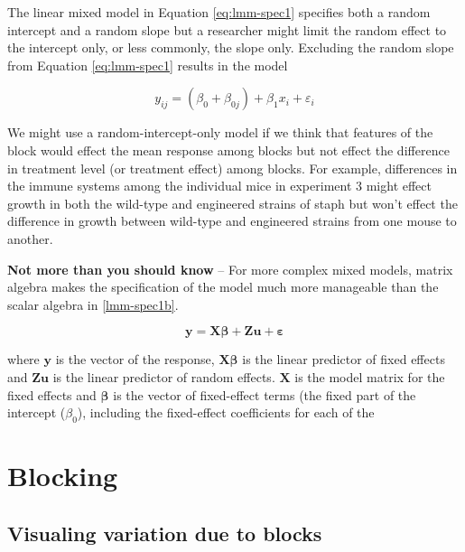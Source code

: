 \documentclass[]{book}
\begin{document}
The linear mixed model in Equation \eqref{eq:lmm-spec1} specifies both a random intercept and a random slope but a researcher might limit the random effect to the intercept only, or less commonly, the slope only. Excluding the random slope from Equation \eqref{eq:lmm-spec1} results in the model

\begin{equation}
y_{ij} = (\beta_{0} + \beta_{0j}) + \beta_{1}x_i + \varepsilon_i 
\label{eq:lmm-spec1b}
\end{equation}

We might use a random-intercept-only model if we think that features of the block would effect the mean response among blocks but not effect the difference in treatment level (or treatment effect) among blocks. For example, differences in the immune systems among the individual mice in experiment 3 might effect growth in both the wild-type and engineered strains of staph but won't effect the difference in growth between wild-type and engineered strains from one mouse to another.

\textbf{Not more than you should know} -- For more complex mixed models, matrix algebra makes the specification of the model much more manageable than the scalar algebra in \ref{lmm-spec1b}.

\begin{equation}
\mathbf{y} = \mathbf{X}\boldsymbol{\beta} + \mathbf{Zu} + \boldsymbol{\varepsilon}
\end{equation}

where \(\mathbf{y}\) is the vector of the response, \(\mathbf{X}\boldsymbol{\beta}\) is the linear predictor of fixed effects and \(\mathbf{Zu}\) is the linear predictor of random effects. \(\mathbf{X}\) is the model matrix for the fixed effects and \(\boldsymbol{\beta}\) is the vector of fixed-effect terms (the fixed part of the intercept (\(\beta_0\)), including the fixed-effect coefficients for each of the

\hypertarget{blocking}{%
\section{Blocking}\label{blocking}}

\hypertarget{visualing-variation-due-to-blocks}{%
\subsection{Visualing variation due to blocks}\label{visualing-variation-due-to-blocks}}
\end{document}
